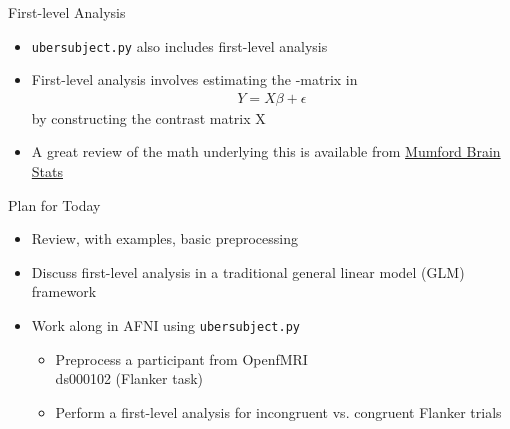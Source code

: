 \documentclass[t,12pt]{beamer}
\begin{document}
\begin{frame}{First-level Analysis}
\vspace{10pt}
\begin{itemize}
\setlength\itemsep{1em}
\item \texttt{uber\textunderscore{}subject.py} also includes first-level analysis
\item First-level analysis involves estimating the \textbeta{}-matrix in
\begin{eqnarray*}
Y = X\beta + \epsilon
\end{eqnarray*}
by constructing the contrast matrix X
\item A great review of the math underlying this is available from \href{http://mumfordbrainstats.tumblr.com/post/125163337126/day-4-multiple-linear-regression}{Mumford Brain Stats}
\end{itemize}
\end{frame}

\begin{frame}{Plan for Today}
\vspace{10pt}
\begin{itemize}
\setlength\itemsep{1em}
\item Review, with examples, basic preprocessing
\item Discuss first-level analysis in a traditional general linear model (GLM) framework
\item Work along in AFNI using \texttt{uber\textunderscore{}subject.py}
\vspace{4pt}
\begin{itemize}
\setlength\itemsep{0.5em}
\item Preprocess a participant from OpenfMRI \\ ds000102 (Flanker task)
\item Perform a first-level analysis for incongruent vs. congruent Flanker trials
\end{itemize}
\end{itemize}
\end{frame}
\end{document}
